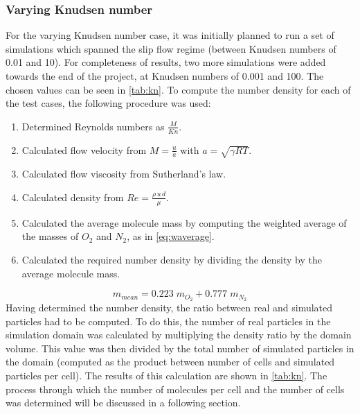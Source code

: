 \subsubsection{Varying Knudsen number}
For the varying Knudsen number case, it was initially planned to run a set of simulations which spanned the slip flow regime (between Knudsen numbers of 0.01 and 10). For completeness of results, two more simulations were added towards the end of the project, at Knudsen numbers of 0.001 and 100.  The chosen values can be seen in \autoref{tab:kn}. 
To compute the number density for each of the test cases, the following procedure was used:
\begin{enumerate}
    \item Determined Reynolds numbers as $\frac{M}{Kn}$.
    \item Calculated flow velocity from $M = \frac{u}{a}$ with $a = \sqrt{\gamma R T}$.
    \item Calculated flow viscosity from Sutherland's law.
    \item Calculated density from $Re = \frac{\rho\, u\, d}{\mu}$.
    \item Calculated the average molecule mass by computing the weighted average of the masses of $O_{2}$ and $N_{2}$, as in \autoref{eq:waverage}.
    \item Calculated the required number density by dividing the density by the average molecule mass.
\end{enumerate}
\begin{equation}
    m_{mean} = 0.223\; m_{O_{2}} + 0.777\; m_{N_{2}}
    \label{eq:waverage}
\end{equation}
Having determined the number density, the ratio between real and simulated particles had to be computed. To do this, the number of real particles in the simulation domain was calculated by multiplying the density ratio by the domain volume. This value was then divided by the total number of simulated particles in the domain (computed as the product between number of cells and simulated particles per cell). The results of this calculation are shown in \autoref{tab:kn}. The process through which  the number of molecules per cell and the number of cells was determined will be discussed in a following section.

